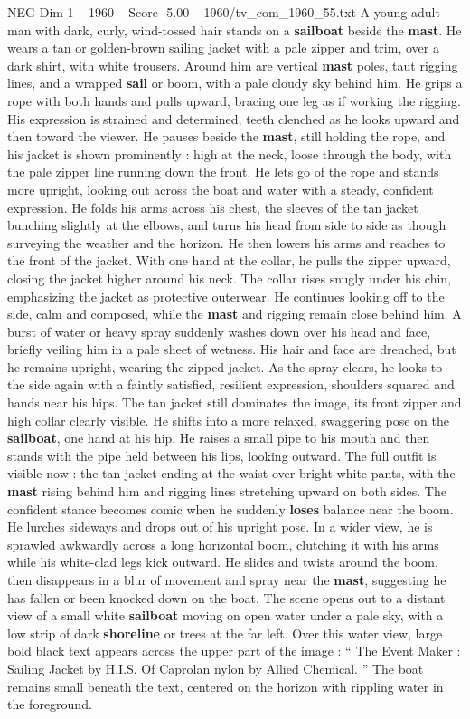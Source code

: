 \begin{textsample}{NEG Dim 1 – 1960 – Score -5.00 – 1960/tv\_com\_1960\_55.txt}  \label{ex:f1_neg_021}
A young adult man with dark, curly, wind-tossed hair stands on a \textbf{sailboat} beside the \textbf{mast}.
He wears a tan or golden-brown sailing jacket with a pale zipper and trim, over a dark shirt, with white trousers.
Around him are vertical \textbf{mast} poles, taut rigging lines, and a wrapped \textbf{sail} or boom, with a pale cloudy sky behind him.
He grips a rope with both hands and pulls upward, bracing one leg as if working the rigging.
His expression is strained and determined, teeth clenched as he looks upward and then toward the viewer.
He pauses beside the \textbf{mast}, still holding the rope, and his jacket is shown prominently : high at the neck, loose through the body, with the pale zipper line running down the front.
He lets go of the rope and stands more upright, looking out across the boat and water with a steady, confident expression.
He folds his arms across his chest, the sleeves of the tan jacket bunching slightly at the elbows, and turns his head from side to side as though surveying the weather and the horizon.
He then lowers his arms and reaches to the front of the jacket.
With one hand at the collar, he pulls the zipper upward, closing the jacket higher around his neck.
The collar rises snugly under his chin, emphasizing the jacket as protective outerwear.
He continues looking off to the side, calm and composed, while the \textbf{mast} and rigging remain close behind him.
A burst of water or heavy spray suddenly washes down over his head and face, briefly veiling him in a pale sheet of wetness.
His hair and face are drenched, but he remains upright, wearing the zipped jacket.
As the spray clears, he looks to the side again with a faintly satisfied, resilient expression, shoulders squared and hands near his hips.
The tan jacket still dominates the image, its front zipper and high collar clearly visible.
He shifts into a more relaxed, swaggering pose on the \textbf{sailboat}, one hand at his hip.
He raises a small pipe to his mouth and then stands with the pipe held between his lips, looking outward.
The full outfit is visible now : the tan jacket ending at the waist over bright white pants, with the \textbf{mast} rising behind him and rigging lines stretching upward on both sides.
The confident stance becomes comic when he suddenly \textbf{loses} balance near the boom.
He lurches sideways and drops out of his upright pose.
In a wider view, he is sprawled awkwardly across a long horizontal boom, clutching it with his arms while his white-clad legs kick outward.
He slides and twists around the boom, then disappears in a blur of movement and spray near the \textbf{mast}, suggesting he has fallen or been knocked down on the boat.
The scene opens out to a distant view of a small white \textbf{sailboat} moving on open water under a pale sky, with a low strip of dark \textbf{shoreline} or trees at the far left.
Over this water view, large bold black text appears across the upper part of the image : “ The Event Maker : Sailing Jacket by H.I.S.
Of Caprolan nylon by Allied Chemical. ” The boat remains small beneath the text, centered on the horizon with rippling water in the foreground.

\end{textsample}
